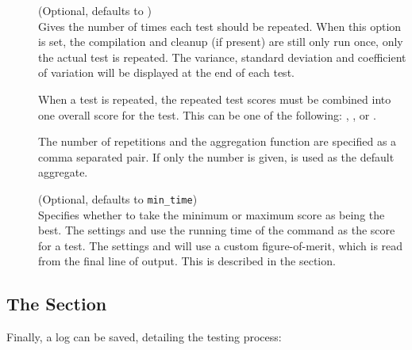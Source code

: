 \documentclass[a4paper, draft]{article}
\begin{document}
\begin{description}

    \item[] (Optional, defaults to ) \\
        Gives the number of times each test should be repeated. When 
        this option is set, the compilation and cleanup (if present) are 
        still only run once, only the actual test is repeated. The variance, 
        standard deviation and coefficient of variation will be displayed at 
        the end of each test.
        
        When a test is repeated, the repeated test scores must be combined 
        into one overall score for the test. This can be one of the following: 
        , ,  or 
        . 
        
        The number of repetitions and the aggregation function are specified 
        as a comma separated pair. If only the number is given, 
         is used as the default aggregate.

    \item[] (Optional, defaults to \texttt{min\_time}) \\
        Specifies whether to take the minimum or maximum score as being the 
        best. The settings  and  
        use the running time of the  command as the score 
        for a test. The settings  and  will 
        use a custom figure-of-merit, which is read from the final line of 
        output. This is described in the \emph{} 
        section.

\end{description}


\subsection{The \confsnippet{[output]} Section}
Finally, a log can be saved, detailing the testing process:
\end{document}
